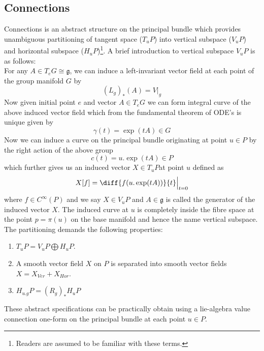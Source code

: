 \documentclass[12pt]{article}
\begin{document}
\subsection{Connections}{\label{one-form}}
Connections is an abstract structure on the principal bundle which provides unambiguous partitioning of tangent space ($T_{u}P$) into vertical subspace ($V_{u}P$) and horizontal subspace ($H_{u}P$)\footnote{Readers are assumed to be familiar with these terms.}. A brief introduction to vertical subspace $V_{u}P$ is as follows: \\
For any $A \in T_{e}G \cong \mathfrak{g}$, we can induce a left-invariant vector field at each point of the group manifold $G$ by 
\[
(L_{g})_{\ast}(A) = V\Bigr|_{g}
\]Now given initial point $e$ and vector $A \in T_{e}G$ we can form integral curve of the above induced vector field which from the fundamental theorem of ODE's is unique given by
\[
\gamma(t) = \exp(tA) \in G
\]Now we can induce a curve on the principal bundle originating at point $u \in P$ by the right action of the above group
\[
c(t) = u.\exp(tA) \in P
\]which further gives us an induced vector $X \in T_{u}P $at point $u$ defined as
\[
X[f] = \diff{f(u.\exp(tA))}{t}\Bigr|_{t=0}
\]where $f \in C^{\infty}(P)$ and we say $X \in V_{u}P$ and $A \in \mathfrak{g}$ is called the generator of the induced vector $X$. The induced curve at $u$ is completely inside the fibre space at the point $p = \pi(u)$ on the base manifold and hence the name vertical subspace.
\\
The partitioning demands the following properties: \\
\begin{enumerate}
    \item $T_{u}P = V_{u}P\bigoplus H_{u}P $.
    \item A smooth vector field $X$ on $P$ is separated into smooth vector fields $X = X_{Ver} + X_{Hor}$.
    \item $H_{u.g}P = (R_{g})_{\ast}H_{u}P$
\end{enumerate} These abstract specifications can be practically obtain using a lie-algebra value connection one-form on the principal bundle at each point $u \in P$.
\end{document}
